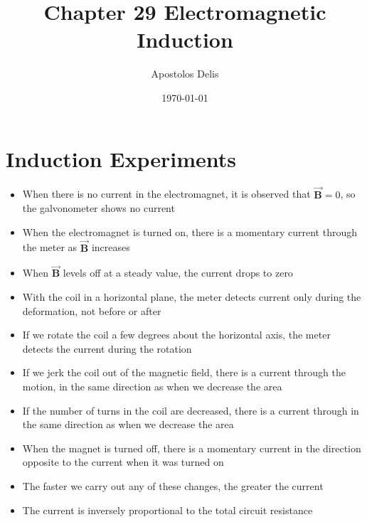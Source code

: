 \documentclass[11pt, a4paper]{article}
\begin{document}
\title{Chapter 29 Electromagnetic Induction}
\author{Apostolos Delis}

\date{\today}
\maketitle

\tableofcontents
\section[29.1, Induction Experiments]{Induction Experiments}
\begin{itemize}
    \item When there is no current in the electromagnet, it is observed that
        $\vec{\mathbf{B}} = 0$, so the galvonometer shows no current
    \item When the electromagnet is turned on, there is a momentary current through the
        meter as $\vec{\mathbf{B}}$ increases
    \item When $\vec{\mathbf{B}}$ levels off at a steady value, the current drops to zero
    \item With the coil in a horizontal plane, the meter detects current only during the
        deformation, not before or after
    \item If we rotate the coil a few degrees about the horizontal axis, the meter
        detects the current during the rotation
    \item If we jerk the coil out of the magnetic field, there is a current through the
        motion, in the same direction as when we decrease the area
    \item If the number of turns in the coil are decreased, there is a current through in
        the same direction as when we decrease the area
    \item When the magnet is turned off, there is a momentary current in the direction
        opposite to the current when it was turned on
    \item The faster we carry out any of these changes, the greater the current
    \item The current is inversely proportional to the total circuit resistance
\end{itemize}
\end{document}
